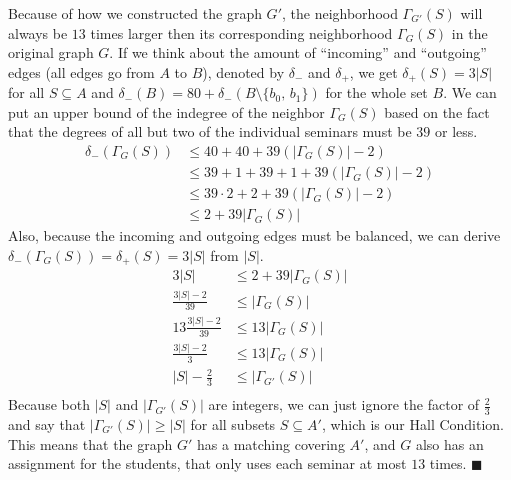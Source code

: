 \documentclass{article}
\begin{document}
  Because of how we constructed the graph $G'$, the neighborhood $\Gamma_{G'}(S)$ will always be $13$ times larger
  then its corresponding neighborhood $\Gamma_{G}(S)$ in the original graph $G$.
  If we think about the amount of ``incoming'' and ``outgoing'' edges (all edges go from $A$ to $B$),
  denoted by $\delta_-$ and $\delta_+$, we get $\delta_+(S) = 3|S|$ for all $S \subseteq A$ and
  $\delta_-(B) = 80 + \delta_-(B \setminus \{b_0,\, b_1\})$ for the whole set $B$.
  We can put an upper bound of the indegree of the neighbor $\Gamma_{G}(S)$ based on the fact that
  the degrees of all but two of the individual seminars must be $39$ or less.
  \begin{align*}
    \delta_-(\Gamma_{G}(S)) &\leq 40 + 40 + 39(|\Gamma_{G}(S)| - 2) \\
    &\leq 39 + 1 + 39 + 1 + 39(|\Gamma_{G}(S)| - 2) \\
    &\leq 39 \cdot 2 + 2 + 39(|\Gamma_{G}(S)| - 2) \\
    &\leq 2 + 39|\Gamma_{G}(S)|
  \end{align*}
  Also, because the incoming and outgoing edges must be balanced, we can derive
  $\delta_-(\Gamma_{G}(S)) = \delta_+(S) = 3|S|$ from $|S|$.
  \begin{align*}
    3|S| &\leq 2 + 39|\Gamma_{G}(S)| \\
    \frac{3|S| - 2}{39} &\leq |\Gamma_{G}(S)| \\
    13\frac{3|S| - 2}{39} &\leq 13|\Gamma_{G}(S)| \\
    \frac{3|S| - 2}{3} &\leq 13|\Gamma_{G}(S)| \\
    |S| - \frac{2}{3} &\leq |\Gamma_{G'}(S)| \\
  \end{align*}
  Because both $|S|$ and $|\Gamma_{G'}(S)|$ are integers, we can just ignore the factor of $\frac{2}{3}$
  and say that $|\Gamma_{G'}(S)| \geq |S|$ for all subsets $S \subseteq A'$, which is our Hall Condition.
  This means that the graph $G'$ has a matching covering $A'$,
  and $G$ also has an assignment for the students, that only uses each seminar at most $13$ times.
  $\blacksquare$

\end{document}
